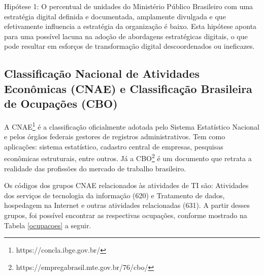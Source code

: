 Hipótese 1: O percentual de unidades do Ministério Público Brasileiro com uma estratégia digital definida e documentada, amplamente divulgada e que efetivamente influencia a estratégia da organização é baixo. Esta hipótese aponta para uma possível lacuna na adoção de abordagens estratégicas digitais, o que pode resultar em esforços de transformação digital descoordenados ou ineficazes.

\subsection{Classificação Nacional de Atividades Econômicas (CNAE) e Classificação Brasileira de Ocupações (CBO)}

A CNAE\footnote{https://concla.ibge.gov.br/} é a classificação oficialmente adotada pelo Sistema Estatístico Nacional e pelos órgãos federais gestores de registros administrativos. Tem como aplicações: sistema estatístico, cadastro central de empresas, pesquisas econômicas estruturais, entre outros. Já a CBO\footnote{https://empregabrasil.mte.gov.br/76/cbo/} é um documento que retrata a realidade das profissões do mercado de trabalho brasileiro. 

Os códigos dos grupos CNAE relacionados às atividades de TI são: Atividades dos serviços de tecnologia da informação (620) e Tratamento de dados, hospedagem na Internet e outras atividades relacionadas (631). A partir desses grupos, foi possível encontrar as respectivas ocupações, conforme mostrado na Tabela \ref{ocupacoes} a seguir.

